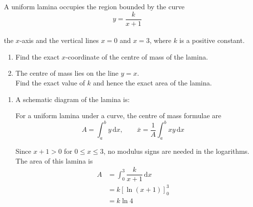 \documentclass[leqno]{article}
\begin{document}
\begin{enumerate}[
  label=\textbf{\arabic*.},
  leftmargin=*,
  topsep=0pt,
  partopsep=0pt,
  parsep=0pt
]
\newpage

\questionitem

A uniform lamina occupies the region bounded by the curve
\[
y=\dfrac{k}{x+1}
\] \\
the $x$-axis and the vertical lines $x=0$ and $x=3$, where $k$ is a positive constant. \\

\begin{enumerate}[label=\textbf{(\alph*)}]
  \item Find the exact $x$-coordinate of the centre of mass of the lamina.  \\
  \item The centre of mass lies on the line $y=x$. \\
  Find the exact value of $k$ and hence the exact area of the lamina.  \\
\end{enumerate}

\vspace*{10pt}

\begin{djsSolution}
\begin{enumerate}[label=\textbf{(\alph*)}, start=1]
\item A schematic diagram of the lamina is:\par\nopagebreak


For a uniform lamina under a curve, the centre of mass formulae are
\[
A=\int_a^b y\,\mathrm{d}x,
\qquad
\bar{x}=\frac{1}{A}\int_a^b xy\,\mathrm{d}x
\]

Since \(x+1>0\) for \(0\leq x\leq3\), no modulus signs are needed in the logarithms. The area of this lamina is
\begin{align*}
A&=\int_0^3 \dfrac{k}{x+1}\,\mathrm{d}x\\
&=k\left[\ln(x+1)\right]_0^3\\
&=k\ln4
\end{align*}


\end{enumerate}
\end{djsSolution}
\end{enumerate}
\end{document}
